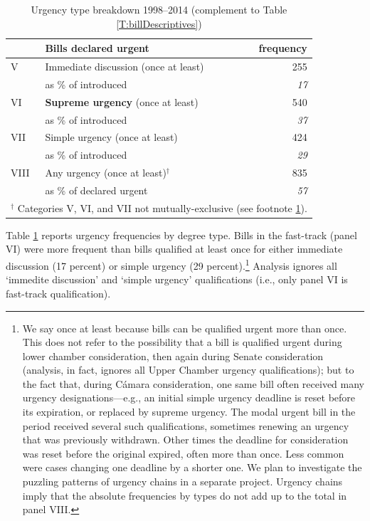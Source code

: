 \documentclass[letter,12pt]{article}
\begin{document}
\begin{table}
\centering
\caption{Urgency type breakdown 1998--2014 (complement to Table \ref{T:billDescriptives})}\label{T:billDescriptivesPartB}
\begin{tabular}{llr}
    & Bills declared urgent                        &  frequency   \\ \hline
V   & Immediate discussion (once at least)         &         255  \\
    & as \% of introduced                          &   \emph{17}  \\ \hdashline
VI  & \textbf{Supreme urgency} (once at least)     &         540  \\
    & as \% of introduced                          &   \emph{37}  \\ \hdashline
VII & Simple urgency (once at least)               &         424  \\
    & as \% of introduced                          &   \emph{29}  \\ \hdashline
VIII& Any urgency (once at least)$^\dagger$          &         835  \\
    & as \% of declared urgent                     &   \emph{57}  \\
\hline
\multicolumn{3}{r}{\footnotesize{$^\dagger$ Categories V, VI, and VII not mutually-exclusive (see footnote \ref{fnNonExclusive}).}} \\
\end{tabular}
\end{table}

Table \ref{T:billDescriptivesPartB} reports urgency frequencies by degree type. Bills in the fast-track (panel VI) were more frequent than bills qualified at least once for either immediate discussion (17 percent) or simple urgency (29 percent).\footnote{\label{fnNonExclusive}We say once at least because bills can be qualified urgent more than once. This does not refer to the possibility that a bill is qualified urgent during lower chamber consideration, then again during Senate consideration (analysis, in fact, ignores all Upper Chamber urgency qualifications); but to the fact that, during Cámara consideration, one same bill often received many urgency designations---e.g., an initial simple urgency deadline is reset before its expiration, or replaced by supreme urgency. The modal urgent bill in the period received several such qualifications, sometimes renewing an urgency that was previously withdrawn. Other times the deadline for consideration was reset before the original expired, often more than once. Less common were cases changing one deadline by a shorter one. We plan to investigate the puzzling patterns of urgency chains in a separate project. Urgency chains imply that the absolute frequencies by types do not add up to the total in panel VIII.} Analysis ignores all `immedite discussion' and `simple urgency' qualifications (i.e., only panel VI is fast-track qualification). 
\end{document}
